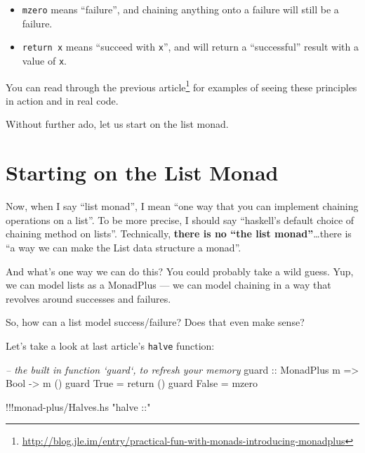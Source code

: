 \documentclass[]{article}
\newenvironment{Shaded}{}{}
\newcommand{\DataTypeTok}[1]{\textcolor[rgb]{0.56,0.13,0.00}{{#1}}}
\newcommand{\StringTok}[1]{\textcolor[rgb]{0.25,0.44,0.63}{{#1}}}
\newcommand{\CommentTok}[1]{\textcolor[rgb]{0.38,0.63,0.69}{\textit{{#1}}}}
\newcommand{\OtherTok}[1]{\textcolor[rgb]{0.00,0.44,0.13}{{#1}}}
\newcommand{\FunctionTok}[1]{\textcolor[rgb]{0.02,0.16,0.49}{{#1}}}
\newcommand{\NormalTok}[1]{{#1}}
\renewcommand{\href}[2]{#2\footnote{\url{#1}}}
\begin{document}
\begin{itemize}
\tightlist
\item
  \texttt{mzero} means ``failure'', and chaining anything onto a failure
  will still be a failure.
\item
  \texttt{return\ x} means ``succeed with \texttt{x}'', and will return
  a ``successful'' result with a value of \texttt{x}.
\end{itemize}

You can read through the
\href{http://blog.jle.im/entry/practical-fun-with-monads-introducing-monadplus}{previous
article} for examples of seeing these principles in action and in real
code.

Without further ado, let us start on the list monad.

\section{Starting on the List Monad}\label{starting-on-the-list-monad}

Now, when I say ``list monad'', I mean ``one way that you can implement
chaining operations on a list''. To be more precise, I should say
``haskell's default choice of chaining method on lists''. Technically,
\textbf{there is no ``the list monad''}\ldots{}there is ``a way we can
make the List data structure a monad''.

And what's one way we can do this? You could probably take a wild guess.
Yup, we can model lists as a MonadPlus --- we can model chaining in a
way that revolves around successes and failures.

So, how can a list model success/failure? Does that even make sense?

Let's take a look at last article's \texttt{halve} function:

\begin{Shaded}
\begin{Highlighting}[]
\CommentTok{-- the built in function `guard`, to refresh your memory}
\OtherTok{guard ::} \DataTypeTok{MonadPlus} \NormalTok{m }\OtherTok{=>} \DataTypeTok{Bool} \OtherTok{->} \NormalTok{m ()}
\NormalTok{guard }\DataTypeTok{True}  \FunctionTok{=} \NormalTok{return ()}
\NormalTok{guard }\DataTypeTok{False} \FunctionTok{=} \NormalTok{mzero}

\FunctionTok{!!!}\NormalTok{monad}\FunctionTok{-}\NormalTok{plus}\FunctionTok{/}\NormalTok{Halves.hs }\StringTok{"halve ::"}
\end{Highlighting}
\end{Shaded}
\end{document}
